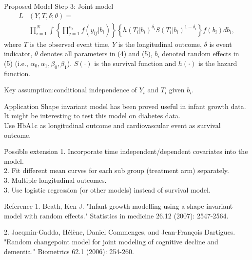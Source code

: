 \documentclass{beamer}
\begin{document}
\begin{frame}[t]{Proposed Model}\vspace{10pt}
Step 3: Joint model
\begin{equation}
\begin{split}
L&(Y,T,\delta ; \theta) = \\
&\prod_{i=1}^{N}\int \left\{\prod_{j=1}^{n_i}f(y_{ij}|b_i)\right\} \left\{ h(T_i|b_i) ^{\delta_i} S(T_i|b_i)^{1-\delta_i}\right\} f(b_i) db_i,
\end{split}
\end{equation}
where $T$ is the observed event time, $Y$ is the longitudinal outcome, $\delta$ is event indicator, $\theta$ denotes all parameters in (4) and (5), $b_i$ denoted random effects in (5) (i.e., $\alpha_0,\alpha_1, \beta_0, \beta_1$). $S(\cdot)$ is the survival function and $h(\cdot)$ is the hazard function.

Key assumption:conditional independence of $Y_i$ and $T_i$ given $b_i$.
\end{frame}

\begin{frame}[t]{Application}\vspace{10pt}
Shape invariant model has been proved useful in infant growth data. \\
It might be interesting to test this model on diabetes data. \\
Use HbA1c as longitudinal outcome and cardiovascular event as survival outcome. 

\end{frame}

\begin{frame}[t]{Possible extension}\vspace{10pt}
1. Incorporate time independent/dependent covariates into the model.\\
2. Fit different mean curves for each sub group (treatment arm) separately.\\
3. Multiple longitudinal outcomes.\\
3. Use logistic regression (or other models) instead of survival model. 

\end{frame}

\begin{frame}[t]{Reference}\vspace{10pt}
1. Beath, Ken J. "Infant growth modelling using a shape invariant model with random effects." Statistics in medicine 26.12 (2007): 2547-2564.

2. Jacqmin‐Gadda, Hélène, Daniel Commenges, and Jean‐François Dartigues. "Random changepoint model for joint modeling of cognitive decline and dementia." Biometrics 62.1 (2006): 254-260.
\end{frame}
\end{document}

